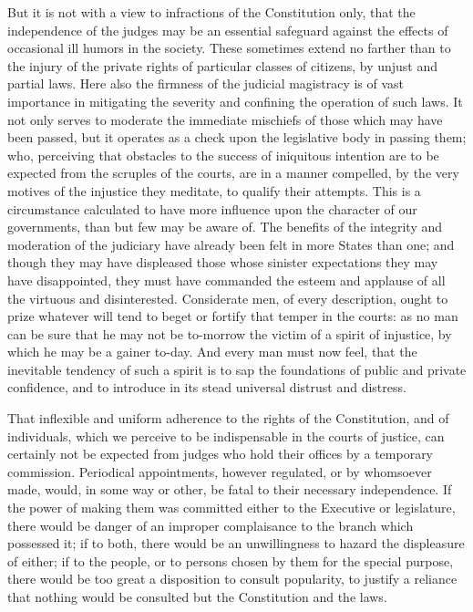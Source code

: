 But it is not with a view to infractions of the Constitution only, that the independence of the judges may be an essential safeguard against the effects of occasional ill humors in the society. These sometimes extend no farther than to the injury of the private rights of particular classes of citizens, by unjust and partial laws. Here also the firmness of the judicial magistracy is of vast importance in mitigating the severity and confining the operation of such laws. It not only serves to moderate the immediate mischiefs of those which may have been passed, but it operates as a check upon the legislative body in passing them; who, perceiving that obstacles to the success of iniquitous intention are to be expected from the scruples of the courts, are in a manner compelled, by the very motives of the injustice they meditate, to qualify their attempts. This is a circumstance calculated to have more influence upon the character of our governments, than but few may be aware of. The benefits of the integrity and moderation of the judiciary have already been felt in more States than one; and though they may have displeased those whose sinister expectations they may have disappointed, they must have commanded the esteem and applause of all the virtuous and disinterested. Considerate men, of every description, ought to prize whatever will tend to beget or fortify that temper in the courts: as no man can be sure that he may not be to-morrow the victim of a spirit of injustice, by which he may be a gainer to-day. And every man must now feel, that the inevitable tendency of such a spirit is to sap the foundations of public and private confidence, and to introduce in its stead universal distrust and distress.

That inflexible and uniform adherence to the rights of the Constitution, and of individuals, which we perceive to be indispensable in the courts of justice, can certainly not be expected from judges who hold their offices by a temporary commission. Periodical appointments, however regulated, or by whomsoever made, would, in some way or other, be fatal to their necessary independence. If the power of making them was committed either to the Executive or legislature, there would be danger of an improper complaisance to the branch which possessed it; if to both, there would be an unwillingness to hazard the displeasure of either; if to the people, or to persons chosen by them for the special purpose, there would be too great a disposition to consult popularity, to justify a reliance that nothing would be consulted but the Constitution and the laws.

